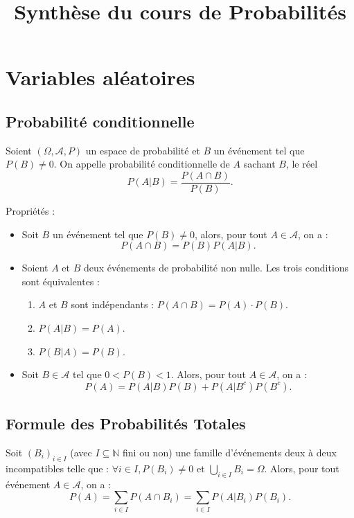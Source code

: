 \documentclass[a4paper,12pt]{article}
\title{Synthèse du cours de Probabilités}
\author{}
\date{}
\begin{document}
\maketitle

\section{Variables aléatoires}

\subsection{Probabilité conditionnelle}

Soient $(\Omega,\mathcal{A}, P)$ un espace de probabilité et $B$ un événement tel que $P(B) \neq 0$. On appelle probabilité conditionnelle de $A$ sachant $B$, le réel
\[
P(A | B) = \frac{P(A \cap B)}{P(B)}.
\]

Propriétés :
\begin{itemize}
    \item Soit $B$ un événement tel que $P(B) \neq 0$, alors, pour tout $A \in \mathcal{A}$, on a :
    \[
    P(A \cap B) = P(B) P(A | B).
    \]
    \item Soient $A$ et $B$ deux événements de probabilité non nulle. Les trois conditions sont équivalentes :
    \begin{enumerate}
        \item $A$ et $B$ sont indépendants : $P(A \cap B) = P(A) \cdot P(B)$.
        \item $P(A | B) = P(A)$.
        \item $P(B | A) = P(B)$.
    \end{enumerate}
    \item Soit $B \in \mathcal{A}$ tel que $0 < P(B) < 1$. Alors, pour tout $A \in \mathcal{A}$, on a :
    \[
    P(A) = P(A | B)P(B) + P(A | B^c)P(B^c).
    \]
\end{itemize}

\subsection{Formule des Probabilités Totales}

Soit $(B_i)_{i \in I}$ (avec $I \subseteq \mathbb{N}$ fini ou non) une famille d'événements deux à deux incompatibles telle que : $\forall i \in I, P(B_i) \neq 0$ et $\bigcup_{i \in I} B_i = \Omega$. Alors, pour tout événement $A \in \mathcal{A}$, on a :
\[
P(A) = \sum_{i \in I} P(A \cap B_i) = \sum_{i \in I} P(A|B_i)P(B_i).
\]
\end{document}
